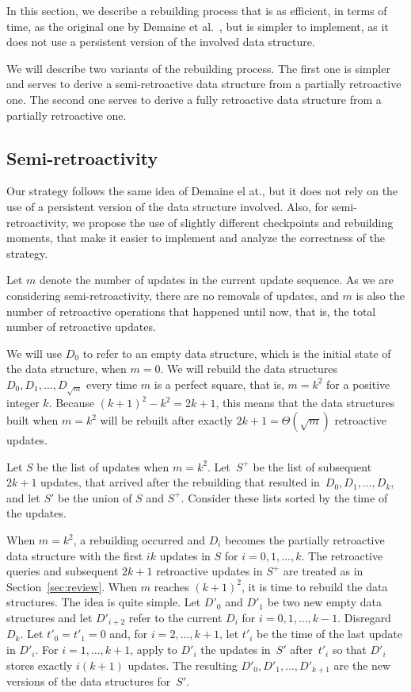 \documentclass[reqno,11pt]{amsart}
\begin{document}
In this section, we describe a rebuilding process that is as efficient, in terms 
of time, as the original one by Demaine et al.~\cite{DemaineIL2007}, but is simpler 
to implement, as it does not use a persistent version of the involved data structure. 

We will describe two variants of the rebuilding process. The first one is simpler
and serves to derive a semi-retroactive data structure from a partially retroactive 
one.  The second one serves to derive a fully retroactive data structure from a 
partially retroactive one. 

\subsection{Semi-retroactivity}\label{subsec:semi}

Our strategy follows the same idea of Demaine el at., but it does not 
rely on the use of a persistent version of the data structure involved. 
Also, for semi-retroactivity, we propose the use of slightly different 
checkpoints and rebuilding moments, that make it easier to implement 
and analyze the correctness of the strategy. 

Let $m$ denote the number of updates in the current update sequence. 
As we are considering semi-retroactivity, there are no removals of updates, 
and $m$ is also the number of retroactive operations that happened until now, 
that is, the total number of retroactive updates. 

We will use $D_0$ to refer to an empty data structure, 
which is the initial state of the data structure, when $m=0$. 
We will rebuild the data structures $D_0,D_1,\ldots,D_{\sqrt{m}}$ every 
time $m$ is a perfect square, that is, $m=k^2$ for a positive integer $k$.
Because $(k+1)^2-k^2 = 2k+1$, this means that the data structures built 
when $m=k^2$ will be rebuilt after exactly $2k+1=\Theta(\sqrt{m})$ retroactive updates.

Let $S$ be the list of updates when $m=k^2$. 
Let~$S^+$ be the list of subsequent $2k+1$ updates, 
that arrived after the rebuilding that resulted in~$D_0,D_1,\ldots,D_k$,
and let $S'$ be the union of $S$ and $S^+$.  
Consider these lists sorted by the time of the updates. 

When $m=k^2$, a rebuilding occurred and $D_i$ becomes the partially retroactive 
data structure with the first $ik$ updates in $S$ for $i=0,1,\ldots,k$. 
The retroactive queries and subsequent $2k+1$ retroactive updates in $S^+$ 
are treated as in Section~\ref{sec:review}. 
When $m$ reaches $(k+1)^2$, it is time to rebuild the data structures.  
The idea is quite simple.  Let $D'_0$ and $D'_1$ be two new empty data structures 
and let $D'_{i+2}$ refer to the current $D_i$ for $i=0,1,\ldots,k-1$.  Disregard $D_k$.   
Let $t'_0 = t'_1 = 0$ and, for $i=2,\ldots,k+1$, 
let $t'_i$ be the time of the last update in $D'_i$.
For $i=1,\ldots,k+1$, apply to $D'_i$ the updates in~$S'$ 
after~$t'_i$ so that $D'_i$ stores exactly $i(k+1)$ updates.
The resulting $D'_0,D'_1,\ldots,D'_{k+1}$ are the new versions of the data structures for~$S'$. 
\end{document}

